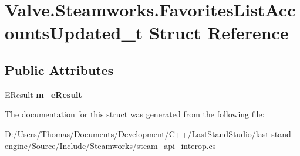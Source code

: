 \hypertarget{structValve_1_1Steamworks_1_1FavoritesListAccountsUpdated__t}{}\section{Valve.\+Steamworks.\+Favorites\+List\+Accounts\+Updated\+\_\+t Struct Reference}
\label{structValve_1_1Steamworks_1_1FavoritesListAccountsUpdated__t}
\subsection*{Public Attributes}
\begin{DoxyCompactItemize}
\item 
\hypertarget{structValve_1_1Steamworks_1_1FavoritesListAccountsUpdated__t_a300ccbb060f1ebe1b005e12c96bc0436}{}E\+Result {\bfseries m\+\_\+e\+Result}\label{structValve_1_1Steamworks_1_1FavoritesListAccountsUpdated__t_a300ccbb060f1ebe1b005e12c96bc0436}

\end{DoxyCompactItemize}


The documentation for this struct was generated from the following file\+:\begin{DoxyCompactItemize}
\item 
D\+:/\+Users/\+Thomas/\+Documents/\+Development/\+C++/\+Last\+Stand\+Studio/last-\/stand-\/engine/\+Source/\+Include/\+Steamworks/steam\+\_\+api\+\_\+interop.\+cs\end{DoxyCompactItemize}
